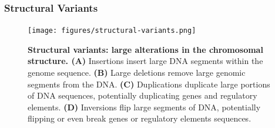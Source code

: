 \documentclass[a4paper, titlepage, openright]{book}
\begin{document}
\subsubsection{Structural Variants}
\begin{figure}[h]
    \centering
    \texttt{[image: figures/structural-variants.png]}
    \caption[Structural variants: large alterations in the chromosomal structure]{\textbf{Structural variants: large alterations in the chromosomal structure. (A)} Insertions insert large DNA segments within the genome sequence. \textbf{(B)} Large deletions remove large genomic segments from the DNA. \textbf{(C)} Duplications duplicate large portions of DNA sequences, potentially duplicating genes and regulatory elements. \textbf{(D)} Inversions flip large segments of DNA, potentially flipping or even break genes or regulatory elements sequences.}
    \label{fig:structural-variants}
\end{figure}
%
\end{document}
